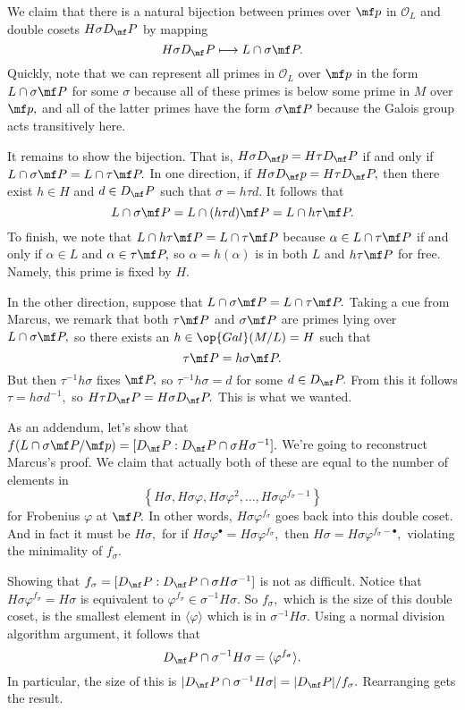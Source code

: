 We claim that there is a natural bijection between primes over $\mf p$ in $\mathcal O_L$ and double cosets $H\sigma D_\mf P$ by mapping
\[H\sigma D_\mf P\longmapsto L\cap\sigma\mf P.\]
Quickly, note that we can represent all primes in $\mathcal O_L$ over $\mf p$ in the form $L\cap\sigma\mf P$ for some $\sigma$ because all of these primes is below some prime in $M$ over $\mf p,$ and all of the latter primes have the form $\sigma\mf P$ because the Galois group acts transitively here.

It remains to show the bijection. That is, $H\sigma D_\mf p=H\tau D_\mf P$ if and only if $L\cap\sigma\mf P=L\cap\tau\mf P.$ In one direction, if $H\sigma D_\mf p=H\tau D_\mf P,$ then there exist $h\in H$ and $d\in D_\mf P$ such that $\sigma=h\tau d.$ It follows that
\[L\cap\sigma\mf P=L\cap(h\tau d)\mf P=L\cap h\tau\mf P.\]
To finish, we note that $L\cap h\tau\mf P=L\cap\tau\mf P$ because $\alpha\in L\cap \tau\mf P$ if and only if $\alpha\in L$ and $\alpha\in\tau\mf P,$ so $\alpha=h(\alpha)$ is in both $L$ and $h\tau\mf P$ for free. Namely, this prime is fixed by $H.$

In the other direction, suppose that $L\cap\sigma\mf P=L\cap\tau\mf P.$ Taking a cue from Marcus, we remark that both $\tau\mf P$ and $\sigma\mf P$ are primes lying over $L\cap\sigma\mf P,$ so there exists an $h\in\op{Gal}(M/L)=H$ such that
\[\tau\mf P=h\sigma\mf P.\]
But then $\tau^{-1}h\sigma$ fixes $\mf P,$ so $\tau^{-1}h\sigma=d$ for some $d\in D_\mf P.$ From this it follows $\tau=h\sigma d^{-1},$ so $H\tau D_\mf P=H\sigma D_\mf P.$ This is what we wanted.

As an addendum, let's show that $f(L\cap\sigma\mf P/\mf p)=[D_\mf P:D_\mf P\cap\sigma H\sigma^{-1}].$ We're going to reconstruct Marcus's proof. We claim that actually both of these are equal to the number of elements in
\[\left\{H\sigma,H\sigma\varphi,H\sigma\varphi^2,\ldots,H\sigma\varphi^{f_\sigma-1}\right\}\]
for Frobenius $\varphi$ at $\mf P.$ In other words, $H\sigma\varphi^{f_\sigma}$ goes back into this double coset. And in fact it must be $H\sigma,$ for if $H\sigma\varphi^\bullet=H\sigma\varphi^{f_\sigma},$ then $H\sigma=H\sigma\varphi^{f_\sigma-\bullet},$ violating the minimality of $f_\sigma.$

Showing that $f_\sigma=[D_\mf P:D_\mf P\cap\sigma H\sigma^{-1}]$ is not as difficult. Notice that $H\sigma\varphi^{f_\sigma}=H\sigma$ is equivalent to $\varphi^{f_\sigma}\in\sigma^{-1} H\sigma.$ So $f_\sigma,$ which is the size of this double coset, is the smallest element in $\langle\varphi\rangle$ which is in $\sigma^{-1}H\sigma.$ Using a normal division algorithm argument, it follows that
\[D_\mf P\cap\sigma^{-1}H\sigma=\langle\varphi^{f_\sigma}\rangle.\]
In particular, the size of this is $|D_\mf P\cap\sigma^{-1}H\sigma|=|D_\mf P|/f_\sigma.$ Rearranging gets the result.

